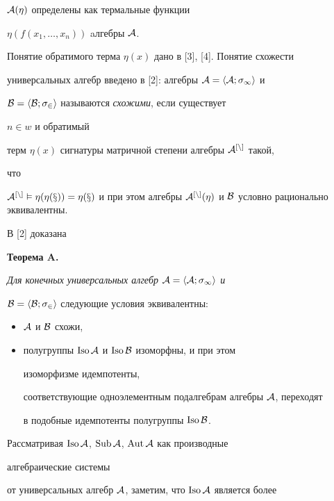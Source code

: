 $\cal A(\eta)$ определены как термальные функции 


$\eta(f(x_1,\dotsc,x_n))$ aлгебры $\cal A$. 


Понятие обратимого терма $\eta(x)$ дано в [3], [4]. Понятие схожести 


универсальных алгебр введено в [2]: алгебры $\cal A=\langle A;\sigma_1\rangle$ и 


$\cal B=\langle B;\sigma_2\rangle$ называются {\it схожими}, если существует 


$n\in w$ и обратимый 


терм $\eta(x)$ сигнатуры матричной степени алгебры $\cal A^{[n]}$ такой, 


что 


$\cal A^{[n]}\vDash\eta(\eta(x))=\eta(x)$ и при этом алгебры $\cal 


A^{[n]}(\eta)$ и $\cal B$ условно рационально эквивалентны. 


В [2] доказана 


\medskip 


 


{\bf Теорема A.} {\it Для конечных универсальных алгебр $\cal A=\la 


A;\sigma_1\ra$ и 


$\cal B=\langle B;\sigma_2\rangle$ следующие условия эквивалентны\/$:$ 


\begin{itemize} 


\item[1)] $\cal A$ и $\cal B$ схожи, 


\item[2)] полугруппы $\operatorname{Iso}\cal A$ и $\operatorname{Iso}\cal B$ изоморфны, и при этом 


изоморфизме идемпотенты, 


соответствующие одноэлементным подалгебрам алгебры $\cal A$, переходят 


в подобные идемпотенты полугруппы $\operatorname{Iso}\cal B$. 


\end{itemize} 


} 


\medskip 


 


Рассматривая $\operatorname{Iso}\cal A$, $\operatorname{Sub}\cal A$, $\operatorname{Aut}\cal A$ как производные 


алгебраические системы 


от универсальных алгебр $\cal A$, заметим, что $\operatorname{Iso}\cal A$ является более 



